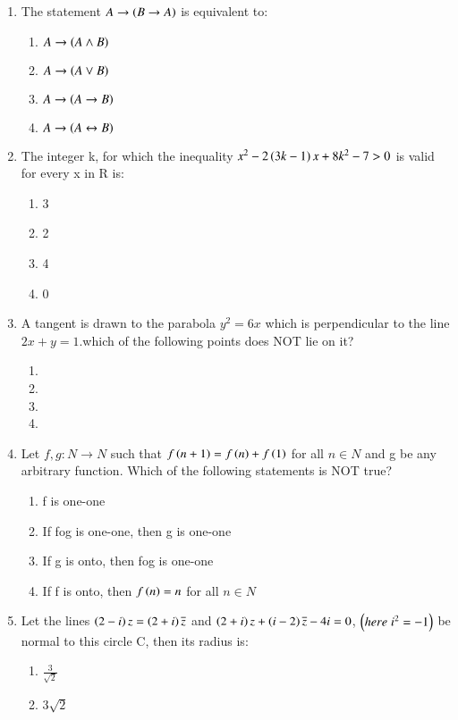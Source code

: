 \documentclass[journal]{IEEEtran}
\begin{document}
\begin{enumerate}
\item The statement $A\to\left(B\to A\right)$ is equivalent to$\colon$
\begin{enumerate}
    \item $A\to\left(A\land B\right)$
    \item $A\to\left(A\lor B\right)$
    \item $A\to\left(A\to B\right)$
    \item $A\to\left(A\leftrightarrow B\right)$
\end{enumerate}
\item The integer k, for which the inequality $x^{2}-2\left(3k-1\right)x+8k^{2}-7>0$ is valid for every x in R is$\colon$
\begin{enumerate}
    \item 3
    \item 2
    \item 4
    \item 0
\end{enumerate}
\item A tangent is drawn to the parabola $y^{2}=6x$ which is perpendicular to the line $2x+y=1$.which of the following points does NOT lie on it?
\begin{enumerate}
    \item {}
    \item {}
    \item {}
    \item {}
\end{enumerate}
\item Let $f,g\colon N\to N$ such that $f\left(n+1\right)=f\left(n\right)+f\left(1\right)$ for all $n\in N$ and g be any arbitrary function. Which of the following statements is NOT true?
\begin{enumerate}
    \item f is one-one
    \item If fog is one-one, then g is one-one
    \item If g is onto, then fog is one-one
    \item If f is onto, then $f\left(n\right)=n$ for all $n \in N$
\end{enumerate}
\item Let the lines $\left(2-i\right)z=\left(2+i\right)\overline{z}$ and $\left(2+i\right)z+\left(i-2\right)\overline{z}-4i=0$, $\left(here\; i^{2}=-1\right)$ be normal to this circle C, then its radius is$\colon$
\begin{enumerate}
    \item $\frac{3}{\sqrt{2}}$
    \item $3\sqrt{2}$

\end{enumerate}
\end{enumerate}
\end{document}
